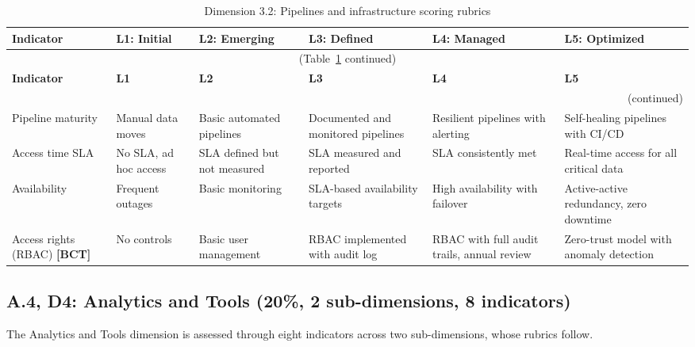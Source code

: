 \begin{center}
{\small
\begin{longtable}{|p{2.4cm}|p{2.0cm}|p{2.0cm}|p{2.2cm}|p{2.2cm}|p{2.2cm}|}
\caption{Dimension 3.2: Pipelines and infrastructure scoring rubrics}\label{tab:d3-2}\\

\hline
\textbf{Indicator} & \textbf{L1: Initial} & \textbf{L2: Emerging} & \textbf{L3: Defined} & \textbf{L4: Managed} & \textbf{L5: Optimized} \\
\hline
\endfirsthead
\multicolumn{6}{c}{\small (Table~\ref{tab:d3-2} continued)} \\
\hline
\textbf{Indicator} & \textbf{L1} & \textbf{L2} & \textbf{L3} & \textbf{L4} & \textbf{L5} \\
\hline
\endhead
\hline
\multicolumn{6}{r}{\small (continued)} \\
\endfoot
\hline
\endlastfoot
Pipeline maturity &
  Manual data moves &
  Basic automated pipelines &
  Documented and monitored pipelines &
  Resilient pipelines with alerting &
  Self-healing pipelines with CI/CD \\
\hline
Access time SLA &
  No SLA, ad hoc access &
  SLA defined but not measured &
  SLA measured and reported &
  SLA consistently met &
  Real-time access for all critical data \\
\hline
Availability &
  Frequent outages &
  Basic monitoring &
  SLA-based availability targets &
  High availability with failover &
  Active-active redundancy, zero downtime \\
\hline
Access rights (RBAC) \textbf{[BCT]} &
  No controls &
  Basic user management &
  RBAC implemented with audit log &
  RBAC with full audit trails, annual review &
  Zero-trust model with anomaly detection \\
\hline
\end{longtable}
}
\end{center}


\subsection*{A.4, D4: Analytics and Tools (20\%, 2 sub-dimensions, 8 indicators)}

The Analytics and Tools dimension is assessed through eight indicators across two sub-dimensions, whose rubrics follow.

